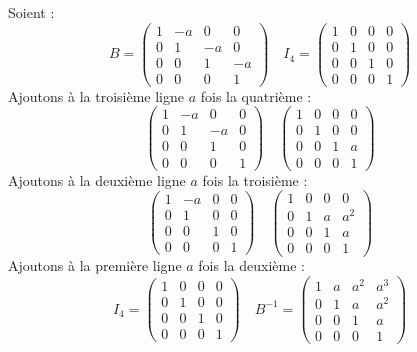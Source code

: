 {	Soient :
	$$
	B=\left(\begin{array}{cccc}
		1 & -a & 0 & 0 \\
		0 & 1 & -a & 0 \\
		0 & 0 & 1 & -a \\
		0 & 0 & 0 & 1
	\end{array}\right) \quad I_4=\left(\begin{array}{cccc}
		1 & 0 & 0 & 0 \\
		0 & 1 & 0 & 0 \\
		0 & 0 & 1 & 0 \\
		0 & 0 & 0 & 1
	\end{array}\right)
	$$
	Ajoutons à la troisième ligne $a$ fois la quatrième :
	$$
	\left(\begin{array}{cccc}
		1 & -a & 0 & 0 \\
		0 & 1 & -a & 0 \\
		0 & 0 & 1 & 0 \\
		0 & 0 & 0 & 1
	\end{array}\right) \quad\left(\begin{array}{llll}
		1 & 0 & 0 & 0 \\
		0 & 1 & 0 & 0 \\
		0 & 0 & 1 & a \\
		0 & 0 & 0 & 1
	\end{array}\right)
	$$
	Ajoutons à la deuxième ligne $a$ fois la troisième :
	$$
	\left(\begin{array}{cccc}
		1 & -a & 0 & 0 \\
		0 & 1 & 0 & 0 \\
		0 & 0 & 1 & 0 \\
		0 & 0 & 0 & 1
	\end{array}\right) \quad\left(\begin{array}{cccc}
		1 & 0 & 0 & 0 \\
		0 & 1 & a & a^2 \\
		0 & 0 & 1 & a \\
		0 & 0 & 0 & 1
	\end{array}\right)
	$$
	Ajoutons à la première ligne $a$ fois la deuxième :
	$$
	I_4=\left(\begin{array}{cccc}
		1 & 0 & 0 & 0 \\
		0 & 1 & 0 & 0 \\
		0 & 0 & 1 & 0 \\
		0 & 0 & 0 & 1
	\end{array}\right) \quad B^{-1}=\left(\begin{array}{cccc}
		1 & a & a^2 & a^3 \\
		0 & 1 & a & a^2 \\
		0 & 0 & 1 & a \\
		0 & 0 & 0 & 1
	\end{array}\right)
	$$
 }